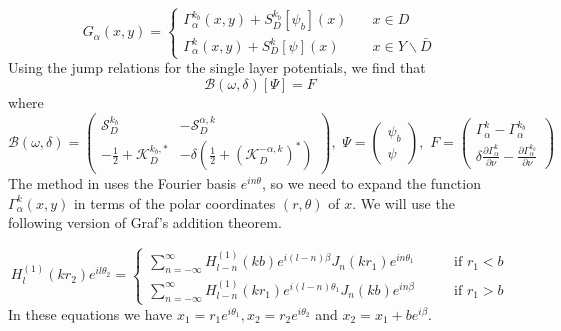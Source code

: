 \documentclass[a4paper]{article}
\theoremstyle{definition}
\newcommand{\B}{\mathcal{B}}
\begin{document}
\begin{equation} \label{eq:G_a}
G_\alpha(x,y) = \begin{cases} \Gamma_\alpha^{k_b}(x,y) + S_D^{k_b}[\psi_b](x) \quad &x\in D \\  \Gamma_\alpha^{k}(x,y) + S_D^{k}[\psi](x) &x\in Y \backslash \bar{D} \end{cases}
\end{equation}
Using the jump relations for the single layer potentials, we find that
\begin{equation*}
\B(\omega,\delta)[\Psi] = F
\end{equation*}
where 
\begin{equation*}
\B(\omega, \delta) = 
\begin{pmatrix}
\mathcal{S}_D^{k_b} &  -\mathcal{S}_D^{\alpha,k}  \\
-\frac{1}{2}+ \mathcal{K}_D^{k_b, *}& -\delta( \frac{1}{2}+ (\mathcal{K}_D^{ -\alpha,k})^*)
\end{pmatrix}, 
\,\, \Psi= 
\begin{pmatrix}
\psi_b\\
\psi
\end{pmatrix},
\,\, F=
\begin{pmatrix}
\Gamma_\alpha^{k} - \Gamma_\alpha^{k_b} \\
\delta\frac{\partial \Gamma_\alpha^{k}}{\partial \nu} -
\frac{\partial \Gamma_\alpha^{k_b}}{\partial \nu} 
\end{pmatrix}
\end{equation*}
The method in \cite{bandgap} uses the Fourier basis $e^{in\theta}$, so  we need to expand the function $\Gamma_\alpha^k(x,y)$ in terms of the polar coordinates $(r,\theta)$ of $x$. We will use the following version of Graf's addition theorem.

\begin{equation*}
H_l^{(1)}(kr_2)e^{il\theta_2} =
\begin{cases}
\sum_{n=-\infty}^\infty H_{l-n}^{(1)}(kb)e^{i(l-n)\beta}J_n(kr_1)e^{in\theta_1} \qquad &\text{if } r_1<b \\
\sum_{n=-\infty}^\infty H_{l-n}^{(1)}(kr_1)e^{i(l-n)\theta_1}J_n(kb)e^{in\beta} \qquad &\text{if } r_1>b
\end{cases}
\end{equation*}
In these equations we have $x_1 = r_1e^{i\theta_1}, x_2 = r_2e^{i\theta_2}$ and $x_2 = x_1 + be^{i\beta}$. 
\end{document}
